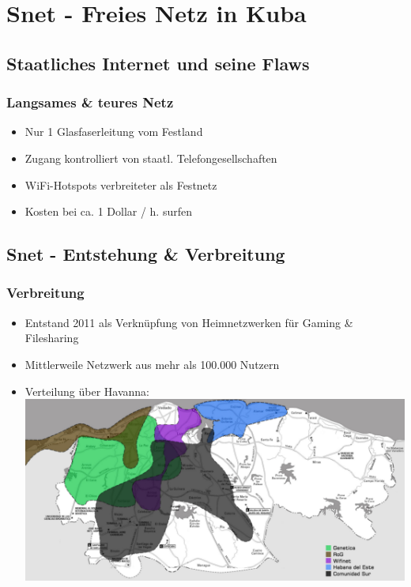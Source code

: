 \section{Snet - Freies Netz in Kuba}
\subsection{Staatliches Internet und seine Flaws}

\begin{frame}
\frametitle{Langsames \& teures Netz}
	\begin{itemize}
		\item Nur 1 Glasfaserleitung vom Festland
		\item Zugang kontrolliert von staatl. Telefongesellschaften
		\item WiFi-Hotspots verbreiteter als Festnetz
		\item Kosten bei ca. 1 Dollar / h. surfen
	\end{itemize}
\end{frame}



\subsection{Snet - Entstehung \& Verbreitung}

\begin{frame}
\frametitle{Verbreitung}
	\begin{itemize}
		\item Entstand 2011 als Verknüpfung von Heimnetzwerken für Gaming \& Filesharing
		\item Mittlerweile Netzwerk aus mehr als 100.000 Nutzern
		\item Verteilung über Havanna:
			\includegraphics[width=\textwidth]{images/havanna_net.jpg}
	\end{itemize}
	
\end{frame}

